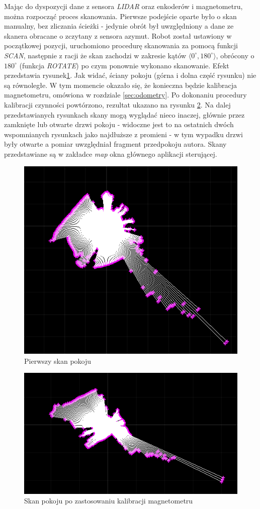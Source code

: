 Mając do dyspozycji dane z sensora \emph{LIDAR} oraz enkoderów i magnetometru, można rozpocząć proces skanowania. Pierwsze podejście oparte było o skan manualny, bez zliczania ścieżki - jedynie obrót był uwzględniony a dane ze skanera obracane o zczytany z sensora azymut. Robot został ustawiony w początkowej pozycji, uruchomiono procedurę skanowania za pomocą funkcji \emph{SCAN}, następnie z racji że skan zachodzi w zakresie kątów $\langle0^{\circ},180^{\circ}\rangle$, obrócony o $180^{\circ}$ (funkcja \emph{ROTATE}) po czym ponownie wykonano skanowanie. Efekt przedstawia rysunek\ref{fig:first-scan}. Jak widać, ściany pokoju (górna i dolna część rysunku) nie są równoległe. W tym momencie okazało się, że konieczna będzie kalibracja magnetometru, omówiona w rozdziale \ref{sec:odometry}. Po dokonaniu procedury kalibracji czynności powtórzono, rezultat ukazano na rysunku \ref{fig:first-magnetom-calibrated-scan}. Na dalej przedstawianych rysunkach skany mogą wyglądać nieco inaczej, głównie przez zamknięte lub otwarte drzwi pokoju - widoczne jest to na ostatnich dwóch wspomnianych rysunkach jako najdłuższe z promieni - w tym wypadku drzwi były otwarte a pomiar uwzględniał fragment przedpokoju autora. Skany przedstawiane są w zakładce \emph{map} okna głównego aplikacji sterującej.

\begin{figure}[ht]
	\centering
		\includegraphics[width=0.6\linewidth]{rys/ScanBot-01-room-map-nocalibration.png}
	\caption{Pierwszy skan pokoju}
	\label{fig:first-scan}
\end{figure}

\begin{figure}[ht]
	\centering
		\includegraphics[width=0.6\linewidth]{rys/ScanBot-02-room-map-calibrated.png}
	\caption{Skan pokoju po zastosowaniu kalibracji magnetometru}
	\label{fig:first-magnetom-calibrated-scan}
\end{figure}

